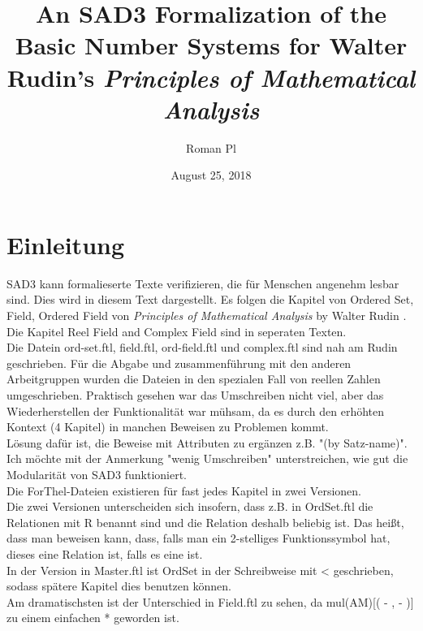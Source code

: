 \documentclass{article}
\begin{document}
\title{An SAD3 Formalization of the Basic Number Systems for Walter Rudin's
\it{Principles of Mathematical Analysis}}

\author{Roman Pl}

\date{August 25, 2018}

\maketitle


\section{Einleitung}
SAD3 kann formalieserte Texte verifizieren, die f\"ur Menschen angenehm lesbar sind.
Dies wird in diesem Text dargestellt. Es folgen die Kapitel von Ordered Set, Field, Ordered Field von {\it Principles of Mathematical Analysis} by Walter Rudin \cite{Rudin}.\\
Die Kapitel Reel Field and Complex Field sind in seperaten Texten.\\

Die Datein ord-set.ftl, field.ftl, ord-field.ftl und complex.ftl sind nah am Rudin geschrieben. F\"ur die Abgabe und zusammenf\"uhrung mit den anderen Arbeitgruppen wurden die Dateien in den spezialen Fall von reellen Zahlen umgeschrieben. Praktisch gesehen war das Umschreiben nicht viel, aber das Wiederherstellen der Funktionalit\"at war m\"uhsam, da es durch den erh\"ohten Kontext (4 Kapitel) in manchen Beweisen zu Problemen kommt.\\
L\"osung daf\"ur ist, die Beweise mit Attributen zu erg\"anzen z.B. "(by Satz-name)".
Ich m\"ochte mit der Anmerkung "wenig Umschreiben" unterstreichen, wie gut die Modularit\"at von SAD3 funktioniert.\\

Die ForThel-Dateien existieren f\"ur fast jedes Kapitel in zwei Versionen.\\
Die zwei Versionen unterscheiden sich insofern, dass z.B. in OrdSet.ftl die Relationen mit R benannt sind und die Relation deshalb beliebig ist. Das hei\ss t, dass man beweisen kann, dass, falls man ein 2-stelliges Funktionssymbol hat, dieses eine Relation ist, falls es eine ist.\\
In der Version in Master.ftl ist OrdSet in der Schreibweise mit < geschrieben, sodass sp\"atere Kapitel dies benutzen k\"onnen.\\

Am dramatischsten ist der Unterschied in Field.ftl zu sehen, da mul(AM)[( - , - )] zu einem einfachen * geworden ist.\\
\end{document}
